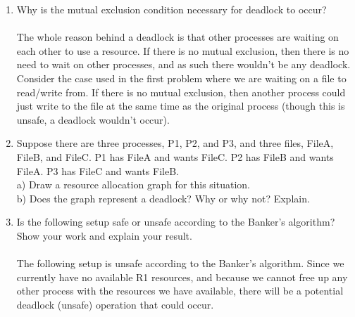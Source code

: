 \documentclass[12pt]{article}
\begin{document}
\begin{enumerate}
   \item Why is the mutual exclusion condition necessary for deadlock to occur? \\ \\
   The whole reason behind a deadlock is that other processes are waiting on each other to use a resource. If there is no mutual exclusion, then there is no need to wait on other processes, and as such there wouldn't be any deadlock. Consider the case used in the first problem where we are waiting on a file to read/write from. If there is no mutual exclusion, then another process could just write to the file at the same time as the original process (though this is unsafe, a deadlock wouldn't occur). 
   
   \item Suppose there are three processes, P1, P2, and P3, and three files, FileA, FileB, and FileC. P1 has FileA and wants FileC.  P2 has FileB and wants FileA.  P3 has FileC and wants FileB.  \\
   a) Draw a resource allocation graph for this situation. \\
   b) Does the graph represent a deadlock?  Why or why not? Explain.
   
   \item Is the following setup safe or unsafe according to the Banker's algorithm? Show your work and explain your result. \\ \\
	The following setup is unsafe according to the Banker's algorithm. Since we currently have no available R1 resources, and because we cannot free up any other process with the resources we have available, there will be a potential deadlock (unsafe) operation that could occur.       
      
\end{enumerate}
\end{document}
